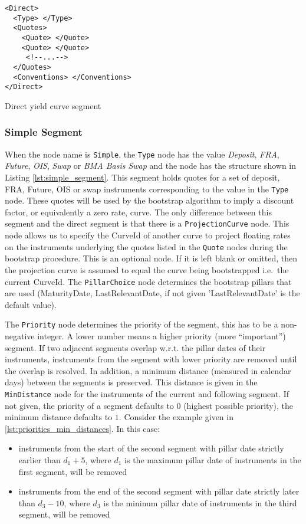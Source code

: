 \begin{listing}[H]
\begin{verbatim}
<Direct>
  <Type> </Type>
  <Quotes>
    <Quote> </Quote>
    <Quote> </Quote>
     <!--...-->
  </Quotes>
  <Conventions> </Conventions>
</Direct>
\end{verbatim}
\caption{Direct yield curve segment}
\label{lst:direct_segment}
\end{listing}


\subsubsection*{Simple Segment}
When the node name is \lstinline!Simple!, the \lstinline!Type! node has the value \emph{Deposit}, \emph{FRA},
\emph{Future}, \emph{OIS}, \emph{Swap} or \emph{BMA Basis Swap} and the node has the structure shown in Listing
\ref{lst:simple_segment}. This segment holds quotes for a set of deposit, FRA, Future, OIS or swap instruments
corresponding to the value in the \lstinline!Type! node. These quotes will be used by the bootstrap algorithm to imply a
discount factor, or equivalently a zero rate, curve. The only difference between this segment and the direct segment is
that there is a \lstinline!ProjectionCurve! node. This node allows us to specify the CurveId of another curve to project
floating rates on the instruments underlying the quotes listed in the \lstinline!Quote! nodes during the bootstrap
procedure. This is an optional node. If it is left blank or omitted, then the projection curve is assumed to equal the
curve being bootstrapped i.e.\ the current CurveId. The \lstinline!PillarChoice! node determines the bootstrap pillars
that are used (MaturityDate, LastRelevantDate, if not given 'LastRelevantDate' is the default value).

The \lstinline!Priority! node determines the priority of the segment, this has to be a non-negative integer. A lower
number means a higher priority (more ``important'') segment. If two adjacent segments overlap w.r.t. the pillar dates of
their instruments, instruments from the segment with lower priority are removed until the overlap is resolved. In
addition, a minimum distance (measured in calendar days) between the segments is preserved. This distance is given in
the \lstinline!MinDistance! node for the instruments of the current and following segment. If not given, the priority of
a segment defaults to 0 (highest possible priority), the minimum distance defaults to $1$. Consider the example given in
\ref{lst:priorities_min_distances}. In this case:
\begin{itemize}
\item instruments from the start of the second segment with pillar date strictly earlier than $d_1 + 5$, where $d_1$ is
  the maximum pillar date of instruments in the first segment, will be removed
\item instruments from the end of the second segment with pillar date strictly later than $d_3 - 10$, where $d_3$ is the
  mininum pillar date of instruments in the third segment, will be removed
\end{itemize}


